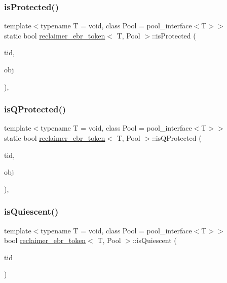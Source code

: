 \subsubsection{\texorpdfstring{is\+Protected()}{isProtected()}}
{\footnotesize\ttfamily template$<$typename T  = void, class Pool  = pool\+\_\+interface$<$\+T$>$$>$ \\
static bool \hyperlink{classreclaimer__ebr__token}{reclaimer\+\_\+ebr\+\_\+token}$<$ T, Pool $>$\+::is\+Protected (\begin{DoxyParamCaption}\item[{const int}]{tid,  }\item[{T $\ast$const}]{obj }\end{DoxyParamCaption})\hspace{0.3cm}{\ttfamily [inline]}, {\ttfamily [static]}}

\mbox{\label{classreclaimer__ebr__token_ac4a89ebcacf0b057041322aa1a677c42}} 
\subsubsection{\texorpdfstring{is\+Q\+Protected()}{isQProtected()}}
{\footnotesize\ttfamily template$<$typename T  = void, class Pool  = pool\+\_\+interface$<$\+T$>$$>$ \\
static bool \hyperlink{classreclaimer__ebr__token}{reclaimer\+\_\+ebr\+\_\+token}$<$ T, Pool $>$\+::is\+Q\+Protected (\begin{DoxyParamCaption}\item[{const int}]{tid,  }\item[{T $\ast$const}]{obj }\end{DoxyParamCaption})\hspace{0.3cm}{\ttfamily [inline]}, {\ttfamily [static]}}

\mbox{\label{classreclaimer__ebr__token_a7cd87fdf1ae24baad3bfb808f329a57a}} 
\subsubsection{\texorpdfstring{is\+Quiescent()}{isQuiescent()}}
{\footnotesize\ttfamily template$<$typename T  = void, class Pool  = pool\+\_\+interface$<$\+T$>$$>$ \\
bool \hyperlink{classreclaimer__ebr__token}{reclaimer\+\_\+ebr\+\_\+token}$<$ T, Pool $>$\+::is\+Quiescent (\begin{DoxyParamCaption}\item[{const int}]{tid }\end{DoxyParamCaption})\hspace{0.3cm}{\ttfamily [inline]}}

